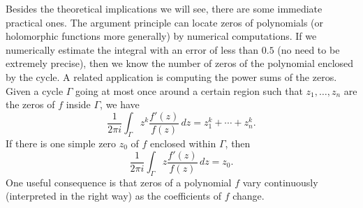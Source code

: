 \documentclass[12pt,openany]{book}
\theoremstyle{plain}
\theoremstyle{remark}
\theoremstyle{definition}
\theoremstyle{exercise}
\theoremstyle{example}
\begin{document}
Besides the theoretical implications we will see,
there are some immediate practical ones.
The argument principle can locate zeros of polynomials
(or holomorphic functions more generally)
by numerical computations.  If we numerically estimate the integral with
an error of less than $0.5$ (no need to be extremely precise),
then we know the number of zeros 
of the polynomial enclosed by the cycle.
A related application is computing the power sums of the zeros.
Given a cycle $\Gamma$ going at most
once around a certain region such that $z_1,\ldots,z_n$ are the zeros of $f$
inside $\Gamma$, we have
\begin{equation*}
\frac{1}{2\pi i}
\int_\Gamma z^k \frac{f'(z)}{f(z)} \, dz
=
z_1^k + \cdots + z_n^k .
\end{equation*}
If there is one simple zero $z_0$ of
$f$ enclosed within $\Gamma$, then
\begin{equation*}
\frac{1}{2\pi i}
\int_\Gamma z \frac{f'(z)}{f(z)} \, dz
=
z_0 .
\end{equation*}
One useful consequence is that zeros of a polynomial $f$ vary continuously
(interpreted in the right way) as the coefficients of $f$ change.
\end{document}
